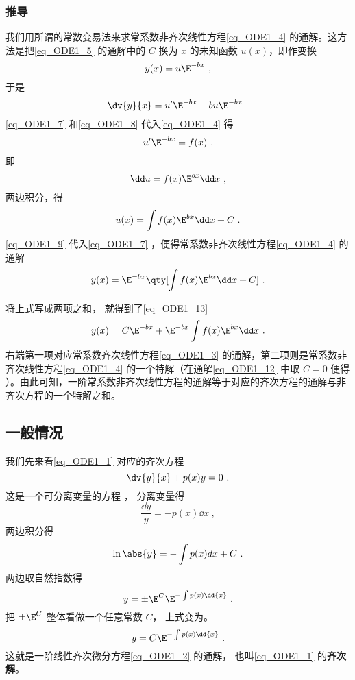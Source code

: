 \subsubsection{推导}
我们用所谓的常数变易法来求常系数非齐次线性方程\autoref{eq_ODE1_4} 的通解。这方法是把\autoref{eq_ODE1_5} 的通解中的 $C$ 换为 $x$ 的未知函数 $u(x)$，即作变换
\begin{equation}\label{eq_ODE1_7}
y(x)=u\E^{-bx}~,
\end{equation}
于是
\begin{equation}\label{eq_ODE1_8}
\dv{y}{x}=u'\E^{-bx}-bu\E^{-bx}~.
\end{equation}
\autoref{eq_ODE1_7} 和\autoref{eq_ODE1_8} 代入\autoref{eq_ODE1_4} 得
\begin{equation}
u'\E^{-bx}=f(x)~,
\end{equation}
即
\begin{equation}
\dd u=f(x)\E^{bx}\dd x~,
\end{equation}
两边积分，得
\begin{equation}\label{eq_ODE1_9}
u(x)=\int f(x)\E^{bx}\dd x+C~.
\end{equation}
\autoref{eq_ODE1_9} 代入\autoref{eq_ODE1_7} ，便得常系数非齐次线性方程\autoref{eq_ODE1_4} 的通解
\begin{equation}\label{eq_ODE1_12}
y(x)=\E^{-bx}\qty[\int f(x)\E^{bx}\dd x+C]~.
\end{equation}

将上式写成两项之和， 就得到了\autoref{eq_ODE1_13}
\begin{equation}
y(x)=C\E^{-bx}+\E^{-bx}\int f(x)\E^{bx}\dd x~.
\end{equation}
右端第一项对应常系数齐次线性方程\autoref{eq_ODE1_3} 的通解，第二项则是常系数非齐次线性方程\autoref{eq_ODE1_4} 的一个特解（在通解\autoref{eq_ODE1_12} 中取 $C=0$ 便得 ）。由此可知，一阶常系数非齐次线性方程的通解等于对应的齐次方程的通解与非齐次方程的一个特解之和。

\subsection{一般情况}
我们先来看\autoref{eq_ODE1_1} 对应的齐次方程
\begin{equation}\label{eq_ODE1_2}
\dv{y}{x} + p(x)y = 0~.
\end{equation}
这是一个可分离变量的方程%
， 分离变量得
\begin{equation}
\frac{\dd{y}}{y} = -p(x) \dd{x}~,
\end{equation}
两边积分得
\begin{equation}
\ln\abs{y} = -\int p(x) dx + C~.
\end{equation}
两边取自然指数得
\begin{equation}
y = \pm \E^C \E^{-\int p(x) \dd{x}}~.
\end{equation}
把 $\pm \E^C $ 整体看做一个任意常数 $C$， 上式变为。
\begin{equation}\label{eq_ODE1_6}
y = C \E^{-\int p(x) \dd{x}}~.
\end{equation}
这就是一阶线性齐次微分方程\autoref{eq_ODE1_2} 的通解， 也叫\autoref{eq_ODE1_1} 的\textbf{齐次解}。

